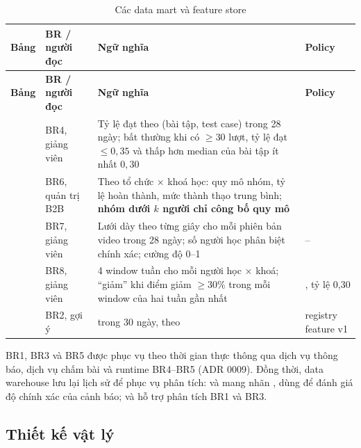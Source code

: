 {\small
\begin{longtable}{@{}L{3.6cm}L{2.0cm}L{6.0cm}L{2.9cm}@{}}
\caption{Các data mart và feature store}\label{tab:marts}\\
\toprule
\textbf{Bảng} & \textbf{BR / người đọc} & \textbf{Ngữ nghĩa} & \textbf{Policy} \\
\midrule
\endfirsthead
\toprule
\textbf{Bảng} & \textbf{BR / người đọc} & \textbf{Ngữ nghĩa} & \textbf{Policy} \\
\midrule
\endhead
{} & BR4, giảng viên & Tỷ lệ đạt theo (bài tập, test case) trong 28 ngày; bất thường khi có $\ge 30$ lượt, tỷ lệ đạt $\le 0{,}35$ và thấp hơn median của bài tập ít nhất $0{,}30$ &  \\
 & BR6, quản trị B2B & Theo tổ chức × khoá học: quy mô nhóm, tỷ lệ hoàn thành, mức thành thạo trung bình; \textbf{nhóm dưới $k$ người chỉ công bố quy mô}~\cite{sweeney2002} &  \\
 & BR7, giảng viên & Lưới dày theo từng giây cho mỗi phiên bản video trong 28 ngày; số người học phân biệt chính xác; cường độ 0--1 & -- \\
 & BR8, giảng viên & 4 window tuần cho mỗi người học × khoá; ``giảm'' khi điểm giảm $\ge 30\%$ trong mỗi window của hai tuần gần nhất & , tỷ lệ 0,30 \\
 & BR2, gợi ý &  trong 30 ngày, theo  & registry feature v1 \\
\bottomrule
\end{longtable}}

BR1, BR3 và BR5 được phục vụ theo thời gian thực thông qua dịch vụ thông báo, dịch vụ chấm bài và runtime BR4--BR5 (ADR 0009). Đồng thời, data warehouse lưu lại lịch sử để phục vụ phân tích:  và  mang nhãn , dùng để đánh giá độ chính xác của cảnh báo;  và  hỗ trợ phân tích BR1 và BR3.

\subsection{Thiết kế vật lý}

